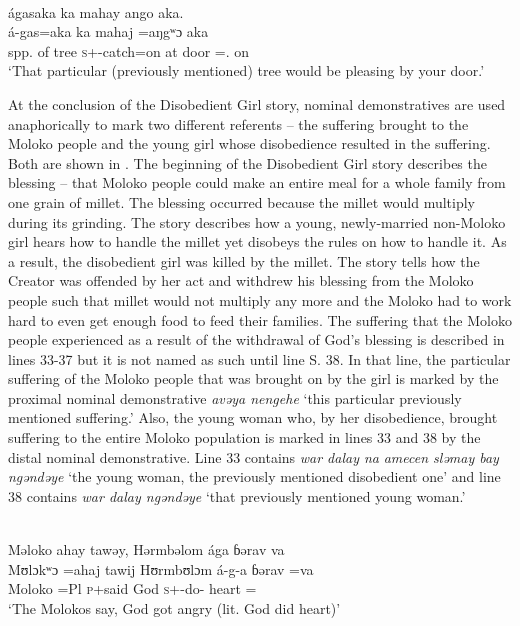\clearpage
\ea\label{ex:3:49}\\  ágasaka  ka  mahay  ango  aka.\\
  á-gas=aka  ka  mahaj  =aŋgʷɔ    aka\\
      {spp. of tree}  {\DEM}              \textsc{s}+{\IFV}-catch=on    at    door  ={\twoS}.{\POSS}  on\\
\glt  ‘That particular (previously mentioned) tree would be pleasing by your door.’ 
\z

At the conclusion of the Disobedient Girl story, nominal demonstratives are used anaphorically to mark two different referents -- the suffering brought to the Moloko people and the young girl whose disobedience resulted in the suffering. Both are shown in . The beginning of the Disobedient Girl story describes the blessing -- that Moloko people could make an entire meal for a whole family from one grain of millet. The blessing occurred because the millet would multiply during its grinding. The story describes how a young, newly-married non-Moloko girl hears how to handle the millet yet disobeys the rules on how to handle it. As a result, the disobedient girl was killed by the millet. The story tells how the Creator was offended by her act and withdrew his blessing from the Moloko people such that millet would not multiply any more and the Moloko had to work hard to even get enough food to feed their families. The suffering that the Moloko people experienced as a result of the withdrawal of God’s blessing is described in lines 33-37 but it is not named as such until line S. 38. In that line, the particular suffering of the Moloko people that was brought on by the girl is marked by the proximal nominal demonstrative \textit{avəya nengehe} ‘this particular previously mentioned suffering.' Also, the young woman who, by her disobedience, brought suffering to the entire Moloko population is marked in lines 33 and 38 by the distal nominal demonstrative. Line 33 contains \textit{war dalay na} \textit{amecen sləmay bay} \textit{ngəndəye} ‘the young woman, the previously mentioned disobedient one’ and line 38 contains \textit{war dalay ngəndəye} ‘that previously mentioned young woman.’

\ea \label{ex:3:50} \\
      Məloko  ahay  tawəy,  Hərmbəlom  ága  ɓərav  va  \\
\gll  Mʊlɔkʷɔ =ahaj tawij Hʊrmbʊlɔm á-g-a ɓərav =va     \\
      Moloko =Pl \textsc{p}+said God \textsc{s}+{\IFV}-do-{\CL} heart ={\PRF}      \\
      \glt  ‘The Molokos say, God got angry (lit. God did heart)’ \\
      
